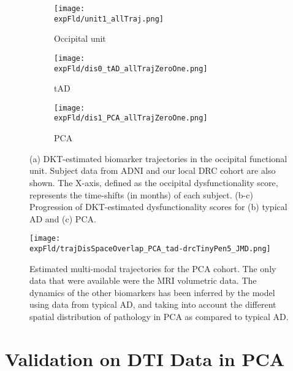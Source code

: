 \begin{figure}
\centering
\begin{subfigure}{\textwidth}
\centering
\texttt{[image: \\expFld/unit1\_allTraj.png]}
\caption{Occipital unit}
\label{fig:dktFitUnit}
\end{subfigure}
\vspace{2em}

\begin{subfigure}{0.47\textwidth}
\centering
\texttt{[image: \\expFld/dis0\_tAD\_allTrajZeroOne.png]}
\caption{tAD}
\label{fig:dktFitAD}
\end{subfigure}
\begin{subfigure}{0.47\textwidth}
\centering
\texttt{[image: \\expFld/dis1\_PCA\_allTrajZeroOne.png]}
\caption{PCA}
\label{fig:dktFitPCA}
\end{subfigure}
\caption[DKT results - biomarker trajectories in the occipital unit and dysfunctionality scores for tAD and PCA]{(a) DKT-estimated biomarker trajectories in the occipital functional unit. Subject data from ADNI and our local DRC cohort are also shown. The X-axis, defined as the occipital dysfunctionality score, represents the time-shifts (in months) of each subject. (b-c) Progression of DKT-estimated dysfunctionality scores for (b) typical AD and (c) PCA.}
\label{fig:pcaTadDisSpace}
\end{figure}

\begin{figure}
 \texttt{[image: \\expFld/trajDisSpaceOverlap\_PCA\_tad-drcTinyPen5\_JMD.png]}
 \caption[Estimated multi-modal trajectories for the PCA cohort.]{Estimated multi-modal trajectories for the PCA cohort. The only data that were available were the MRI volumetric data. The dynamics of the other biomarkers has been inferred by the model using data from typical AD, and taking into account the different spatial distribution of pathology in PCA as compared to typical AD.}
 \label{fig:PCAtrajByModality}
\end{figure}


\section{Validation on DTI Data in PCA}
\label{sec:dktResVal}

